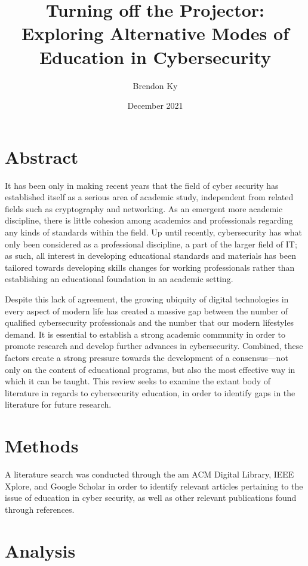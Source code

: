 \documentclass{article}
\title{
    Turning off the Projector: \\
    \large Exploring Alternative Modes of Education in Cybersecurity
}
\author{Brendon Ky}
\date{December 2021}
\begin{document}
\maketitle

\section{Abstract}

    It has been only in making recent years that the field of cyber security has established itself as a serious area of academic study, independent from related fields such as cryptography and networking. As an emergent more academic discipline, there is little cohesion among academics and professionals regarding any kinds of standards within the field. Up until recently, cybersecurity has what only been considered as a professional discipline, a part of the larger field of IT; as such, all interest in developing educational standards and materials has been tailored towards developing skills changes for working professionals rather than establishing an educational foundation in an academic setting. 

    Despite this lack of agreement, the growing ubiquity of digital technologies in every aspect of modern life has created a massive gap between the number of qualified cybersecurity professionals and the number that our modern lifestyles demand. It is essential to establish a strong academic community in order to promote research and develop further advances in cybersecurity. 
    Combined, these factors create a strong pressure towards the development of a consensus---not only on the content of educational programs, but also the most effective way in which it can be taught. 
    This review seeks to examine the extant body of literature in regards to cybersecurity education, in order to identify gaps in the literature for future research.

\section{Methods}

    A literature search was conducted through the am ACM Digital Library, IEEE Xplore, and Google Scholar in order to identify relevant articles pertaining to the issue of education in cyber security, as well as other relevant publications found through references.

\section{Analysis}
\end{document}

